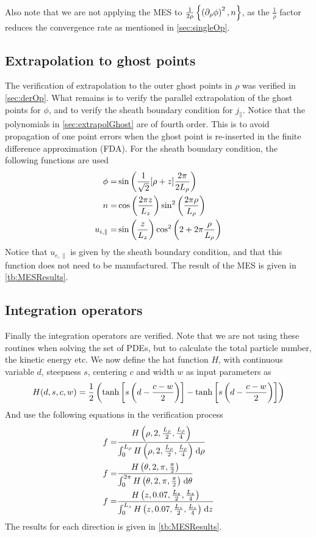 Also note that we are not applying the MES to $\frac{1}{2\rho}\left\{\left(\partial_{\rho} \phi\right)^2,n\right\}$, as the $\frac{1}{\rho}$ factor reduces the convergence rate as mentioned in \cref{sec:singleOp}.

\subsection{Extrapolation to ghost points}
%
The verification of extrapolation to the outer ghost points in $\rho$ was verified in \cref{sec:derOp}.
What remains is to verify the parallel extrapolation of the ghost points for $\phi$, and to verify the sheath boundary condition for $j_{\|}$.
Notice that the polynomials in \cref{sec:extrapolGhost} are of fourth order.
This is to avoid propagation of one point errors when the ghost point is re-inserted in the finite difference approximation (FDA).
For the sheath boundary condition, the following functions are used
%
\begin{align}
    \phi =& \sin\left(\frac{1}{\sqrt{2}}[\rho + z]\frac{2\pi}{2L_\rho}\right)
    \label{eq:MESPhiSheath}
    \\
    n =& \cos\left(\frac{2\pi z}{L_z}\right)\sin^2\left(\frac{2\pi\rho}{L_\rho}\right)
    \label{eq:MESNSheath}
    \\
    u_{i, \|} =& \sin\left(\frac{z}{L_z}\right)\cos^2\left(2+2\pi\frac{\rho}{L_\rho}\right)
    \label{eq:MEUISheath}
\end{align}
%
Notice that $u_{e,\|}$ is given by the sheath boundary condition, and that this function does not need to be manufactured.
The result of the MES is given in \cref{tb:MESResults}.

\subsection{Integration operators}
%
Finally the integration operators are verified.
Note that we are not using these routines when solving the set of PDEs, but to calculate the total particle number, the kinetic energy etc.
We now define the hat function $H$, with continuous variable $d$, steepness $s$, centering $c$ and width $w$ as input parameters as
%
\begin{align}
    H(d,s,c,w) = \frac{1}{2}\left(\tanh\left[s\left(d-\frac{c-w}{2}\right)\right]-\tanh\left[s\left(d-\frac{c-w}{2}\right)\right]\right)
    \label{eq:hat}
\end{align}
%
And use the following equations in the verification process
%
\begin{align}
f =& \frac{H\left(\rho, 2,\frac{L_\rho}{2}, \frac{L_\rho}{4}\right)}{\int_{0}^{L_\rho} {H\left(\rho, 2,\frac{L_\rho}{2}, \frac{L_\rho}{4}\right)} \; \text{d} {\rho}}
\label{eq:MESRhoInt}
\\
f =& \frac{H\left(\theta, 2,\pi, \frac{\pi}{2}\right)}{\int_{0}^{2\pi} {H\left(\theta, 2,\pi, \frac{\pi}{2}\right)} \; \text{d} {\theta}}
\label{eq:MESThetaInt}
\\
f =& \frac{H\left(z, 0.07,\frac{L_z}{2}, \frac{L_z}{4}\right)}{\int_{0}^{L_z} {H\left(z, 0.07,\frac{L_z}{2}, \frac{L_z}{4}\right)} \; \text{d} {z}}
\label{eq:MESZInt}
\end{align}
%
The results for each direction is given in \cref{tb:MESResults}.

